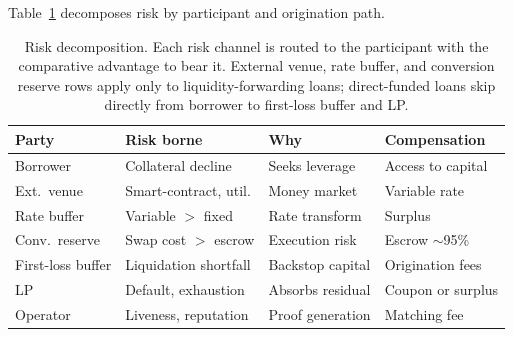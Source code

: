 Table~\ref{tab:risk} decomposes risk by participant and origination path.

\begin{table}[ht]
  \centering
  \small
  \renewcommand{\arraystretch}{1.15}
  \begin{tabular}{@{}llll@{}}
    \toprule
    \textbf{Party} & \textbf{Risk borne} & \textbf{Why} & \textbf{Compensation} \\
    \midrule
    Borrower       & Collateral decline     & Seeks leverage      & Access to capital \\
    Ext.\ venue    & Smart-contract, util.  & Money market         & Variable rate \\
    Rate buffer    & Variable ${>}$ fixed   & Rate transform       & Surplus \\
    Conv.\ reserve & Swap cost ${>}$ escrow & Execution risk       & Escrow ${\sim}$95\% \\
    First-loss buffer & Liquidation shortfall  & Backstop capital     & Origination fees \\
    LP             & Default, exhaustion    & Absorbs residual     & Coupon or surplus \\
    Operator       & Liveness, reputation   & Proof generation      & Matching fee \\
    \bottomrule
  \end{tabular}
  \caption{Risk decomposition. Each risk channel is routed to the participant with the comparative advantage to bear it. External venue, rate buffer, and conversion reserve rows apply only to liquidity-forwarding loans; direct-funded loans skip directly from borrower to first-loss buffer and LP.}
  \label{tab:risk}
\end{table}
